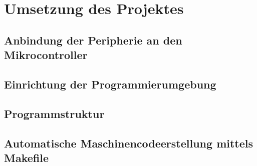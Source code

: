 \chapter{Umsetzung des Projektes}
\section{Anbindung der Peripherie an den Mikrocontroller}
\label{sec:Peri}

\section{Einrichtung der Programmierumgebung}
\label{sec:IDE}

\section{Programmstruktur}
\label{sec:Prog}

\section{Automatische Maschinencodeerstellung mittels Makefile}
\label{sec:Make}


 

